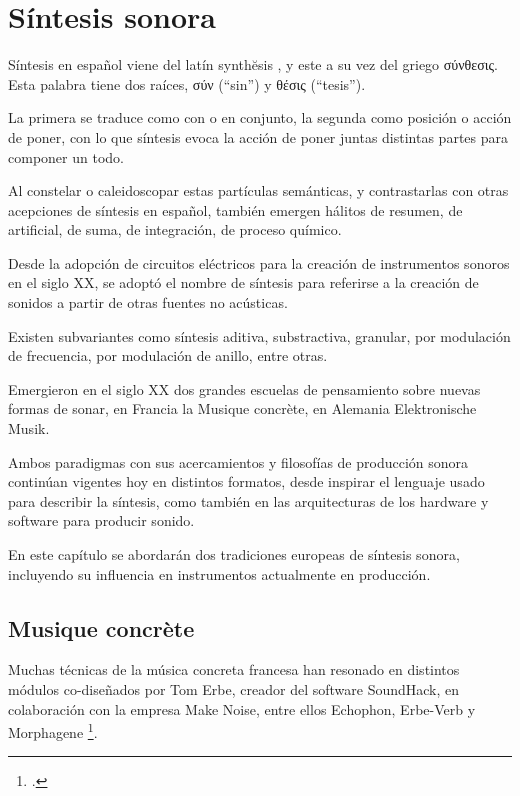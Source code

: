\documentclass[../candidatura.tex]{subfiles}
\begin{document}
\section{Síntesis sonora}

\avisoesbozo

Síntesis en español viene del latín synthĕsis \parencite{rae_sintesis_2022}, y este a su vez del griego \foreignlanguage{greek}{σύνθεσις}. Esta palabra tiene dos raíces, \foreignlanguage{greek}{σύν} (``sin'') y \foreignlanguage{greek}{θέσις} (``tesis'').

La primera se traduce como con o en conjunto, la segunda como posición o acción de poner, con lo que síntesis evoca la acción de poner juntas distintas partes para componer un todo.

Al constelar o caleidoscopar estas partículas semánticas, y contrastarlas con otras acepciones de síntesis en español, también emergen hálitos de resumen, de artificial, de suma, de integración, de proceso químico.

Desde la adopción de circuitos eléctricos para la creación de instrumentos sonoros en el siglo XX, se adoptó el nombre de síntesis para referirse a la creación de sonidos a partir de otras fuentes no acústicas.

Existen subvariantes como síntesis aditiva, substractiva, granular, por modulación de frecuencia, por modulación de anillo, entre otras.

Emergieron en el siglo XX dos grandes escuelas de pensamiento sobre nuevas formas de sonar, en Francia la Musique concrète, en Alemania Elektronische Musik.

Ambos paradigmas con sus acercamientos y filosofías de producción sonora continúan vigentes hoy en distintos formatos, desde inspirar el lenguaje usado para describir la síntesis, como también en las arquitecturas de los hardware y software para producir sonido.

En este capítulo se abordarán dos tradiciones europeas de síntesis sonora, incluyendo su influencia en instrumentos actualmente en producción.


\subsection{Musique concrète}

Muchas técnicas de la música concreta francesa han resonado en distintos módulos co-diseñados por Tom Erbe, creador del software SoundHack, en colaboración con la empresa Make Noise, entre ellos Echophon, Erbe-Verb y Morphagene \footcite{erbe_about_sinfecha}.
\end{document}
